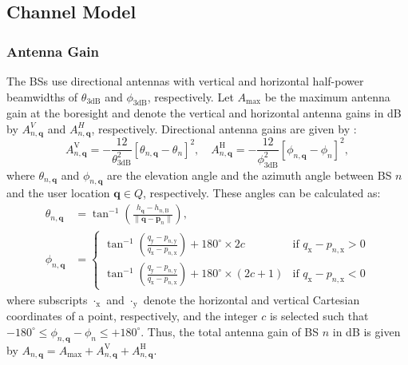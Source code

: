 \subsection{Channel Model}\label{Channel-Model}


\subsubsection{Antenna Gain} The BSs use  directional antennas with vertical and horizontal half-power beamwidths of $\theta_{\textrm{3dB}}$ and $\phi_{\textrm{3dB}}$, respectively. Let $A_{\max}$ be the maximum antenna gain at the boresight and denote the vertical and horizontal antenna gains in dB by $A_{n,\bm{q}}^{V}$ and $A_{n,\bm{q}}^{H}$, respectively. Directional antenna gains are given by \cite{3GPP38901}:
\begin{equation}\label{directional-antenna-gains}
    A_{n,\bm{q}}^{\mathrm{V}} =
    - \frac{12}{\theta^2_{\text{3dB}}} \left[ \theta_{n,\bm{q}} - \theta_n \right]^2, \quad
    A_{n,\bm{q}}^{\mathrm{H}} =
    - \frac{12}{\phi^2_{\text{3dB}}} \left[ \phi_{n,\bm{q}} - \phi_n \right]^2, 
\end{equation}
where $\theta_{n,\bm{q}}$ and $\phi_{n,\bm{q}}$ are the elevation angle and the azimuth angle between BS $n$ and the user location $\bm{q} \in Q$, respectively. These angles can be calculated as:
\begin{align}\label{theta-phi-nq}
    \theta_{n,\bm{q}} &= \tan^{-1}\!\left( \frac{h_{\bm{q}} - h_{n,\mathrm{B}}}{\| \bm{q} - \bm{p}_n \|}  \right), \\
    \phi_{n,\bm{q}} &= \!
\begin{cases}
\tan^{-1}\!\left(\frac{q_{\mathrm{y}}-p_{n,\mathrm{y}}}{q_{\mathrm{x}}-p_{n,\mathrm{x}}}\right) \!+\! 180^{\circ}\!\times\! 2c &  \!\!\!\text{if $q_{\mathrm{x}}-p_{n,\mathrm{x}}>0$}\\
\tan^{-1}\!\left(\frac{q_{\mathrm{y}}-p_{n,\mathrm{y}}}{q_{\mathrm{x}}-p_{n,\mathrm{x}}}\right) \!+\! 180^{\circ}\!\times\! (2c + 1) &  \!\!\!\text{if $q_{\mathrm{x}}-p_{n,\mathrm{x}}<0$}
\end{cases}\nonumber
\end{align}
where subscripts $\cdot_{\mathrm{x}}$ and $\cdot_{\mathrm{y}}$ denote the horizontal and vertical Cartesian coordinates of a point, respectively, and the integer $c$ is selected such that $-180^{\circ} \leq \phi_{n,\bm{q}} - \phi_n \leq +180^{\circ}$. Thus, the total antenna gain of BS $n$ in dB is given by $A_{n, \bm{q}} = A_{\max} + A_{n,\bm{q}}^{\mathrm{V}} +A_{n,\bm{q}}^{\mathrm{H}}$.

